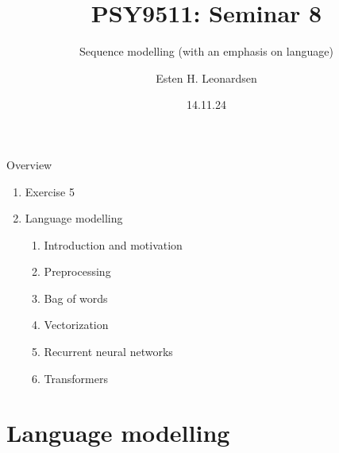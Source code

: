 \documentclass[10pt]{beamer}
\title{PSY9511: Seminar 8}
\subtitle{Sequence modelling (with an emphasis on language)}
\author{Esten H. Leonardsen}
\date{14.11.24}
\begin{document}
	\begin{frame}
	 	\titlepage
	\end{frame}

    \begin{frame}{Overview}
        \begin{enumerate}
            \item Exercise 5
            \item Language modelling
            \begin{enumerate}
                \item Introduction and motivation
                \item Preprocessing
                \item Bag of words
                \item Vectorization
                \item Recurrent neural networks
                \item Transformers
            \end{enumerate}
        \end{enumerate}
    \end{frame}

    

    \section{Language modelling}
\end{document}
